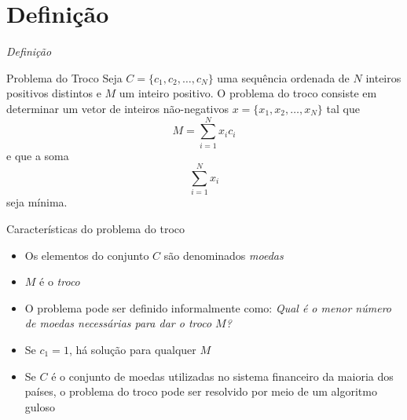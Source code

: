 \section{Definição}

\begin{frame}[fragile]{{\it Definição}}

    \begin{block}{Problema do Troco}
        Seja $C = \{c_1, c_2, \ldots, c_N\}$ uma sequência ordenada de $N$ inteiros positivos
        distintos
        e $M$ um inteiro positivo. O problema do troco consiste em determinar um vetor de inteiros
        não-negativos $x = \{ x_1, x_2, \ldots, x_N \}$ tal que
        \[
            M = \sum_{i = 1}^N x_ic_i
        \]
        e que a soma
        \[
            \sum_{i = 1}^N x_i
        \] seja mínima.
    \end{block}

\end{frame}

\begin{frame}[fragile]{Características do problema do troco}

    \begin{itemize}
        \item Os elementos do conjunto $C$ são denominados \textit{moedas}

        \item $M$ é o \textit{troco}

        \item O problema pode ser definido informalmente como: \textit{Qual é o menor número de
            moedas necessárias para dar o troco $M$?}

        \item Se $c_1 = 1$, há solução para qualquer $M$

        \item Se $C$ é o conjunto de moedas utilizadas no sistema financeiro da maioria dos
            países, o problema do troco pode ser resolvido por meio de um algoritmo guloso
    \end{itemize}

\end{frame}

